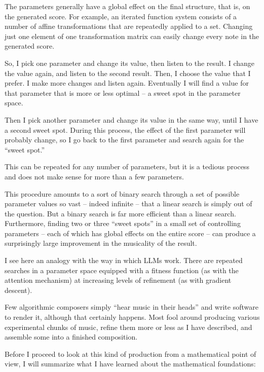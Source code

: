\documentclass[11pt]{scrartcl}
\begin{document}
The parameters generally have a global effect on the final structure, that is, on the generated score. For example, an iterated function system consists of a number of affine transformations that are repeatedly applied to a set. Changing just one element of one transformation matrix can easily change every note in the generated score.

So, I pick one parameter and change its value, then listen to the result. I change the value again, and listen to the second result. Then, I choose the value that I prefer. I make more changes and listen again. Eventually I will find a value for that parameter that is more or less optimal – a sweet spot in the parameter space.

Then I pick another parameter and change its value in the same way, until I have a second sweet spot. During this process, the effect of the first parameter will probably change, so I go back to the first parameter and search again for the “sweet spot.”

This can be repeated for any number of parameters, but it is a tedious process and does not make sense for more than a few parameters.

This procedure amounts to a sort of binary search through a set of possible parameter values so vast – indeed infinite – that a linear search is simply out of the question. But a binary search is far more efficient than a linear search. Furthermore, finding two or three ``sweet spots'' in a small set of controlling parameters – each of which has global effects on the entire score – can produce a surprisingly large improvement in the musicality of the result.

I see here an analogy with the way in which LLMs work. There are repeated searches in a parameter space equipped with a fitness function (as with the attention mechanism) at increasing levels of refinement (as with gradient descent).

Few algorithmic composers simply ``hear music in their heads'' and write software to render it, although that certainly happens. Most fool around producing various experimental chunks of music, refine them more or less as I have described, and assemble some into a finished composition.

Before I proceed to look at this kind of production from a mathematical point of view, I will summarize what I have learned about the mathematical foundations:
\end{document}
